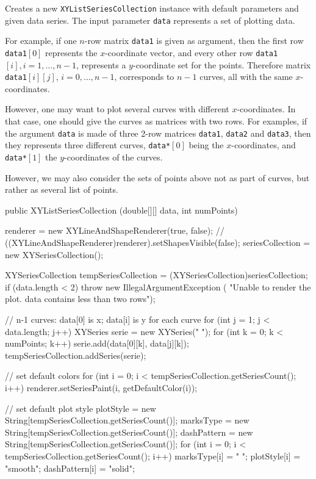 \begin{tabb}
   Creates a new \texttt{XYListSeriesCollection} instance with default
   parameters and given data series. The input parameter \texttt{data}
   represents a set of plotting data.

 For example, if one $n$-row matrix \texttt{data1} is given as argument,
 then the first row \texttt{data1}$[0]$ represents the
 $x$-coordinate vector, and every other row \texttt{data1}$[i],
   i=1,\ldots, n-1$, represents a $y$-coordinate set for the points.
  Therefore matrix \texttt{data1}$[i][j]$, $i=0,\ldots, n-1$,  corresponds
   to $n-1$ curves, all with the same $x$-coordinates.

  However, one may want to plot several curves with different $x$-coordinates.
  In that case, one should give the curves as matrices with two rows.
For examples, if the argument \texttt{data} is made of three 2-row matrices
\texttt{data1}, \texttt{data2} and \texttt{data3}, then they represents
 three different curves, \texttt{data*}$[0]$ being the $x$-coordinates,
 and  \texttt{data*}$[1]$  the $y$-coordinates of the curves.

 However, we may also consider the sets of points above not as part of curves,
but rather as several list of points.
\end{tabb}
\begin{htmlonly}
\end{htmlonly}
\begin{code}

   public XYListSeriesCollection (double[][] data, int numPoints) \begin{hide} {
      renderer = new XYLineAndShapeRenderer(true, false);
     // ((XYLineAndShapeRenderer)renderer).setShapesVisible(false);
      seriesCollection = new XYSeriesCollection();

      XYSeriesCollection tempSeriesCollection = (XYSeriesCollection)seriesCollection;
      if (data.length < 2)
         throw new IllegalArgumentException (
            "Unable to render the plot. data contains less than two rows");

      // n-1 curves: data[0] is x; data[i] is y for each curve
      for (int j = 1; j < data.length; j++) {
         XYSeries serie = new XYSeries(" ");
         for (int k = 0; k < numPoints; k++)
            serie.add(data[0][k], data[j][k]);
         tempSeriesCollection.addSeries(serie);
      }

      // set default colors
      for (int i = 0; i < tempSeriesCollection.getSeriesCount(); i++)
         renderer.setSeriesPaint(i, getDefaultColor(i));

      // set default plot style
      plotStyle = new String[tempSeriesCollection.getSeriesCount()];
      marksType = new String[tempSeriesCollection.getSeriesCount()];
      dashPattern = new String[tempSeriesCollection.getSeriesCount()];
      for (int i = 0; i < tempSeriesCollection.getSeriesCount(); i++) {
         marksType[i] = " ";
         plotStyle[i] = "smooth";
         dashPattern[i] = "solid";
      }
   }\end{hide}
\end{code}
